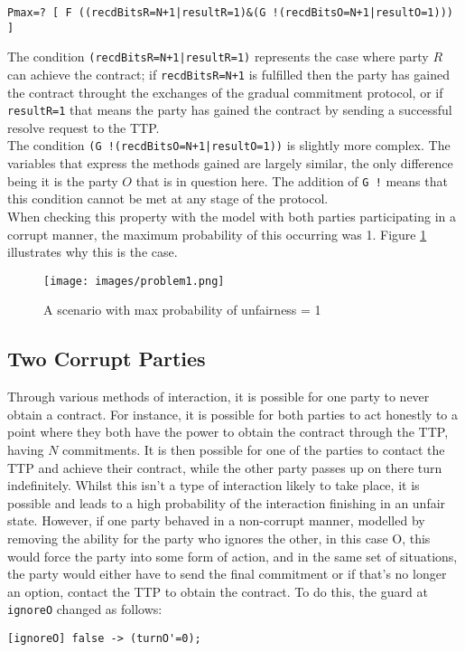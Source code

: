 \documentclass{l4proj}
\begin{document}
\begin{lstlisting}
Pmax=? [ F ((recdBitsR=N+1|resultR=1)&(G !(recdBitsO=N+1|resultO=1))) ]
\end{lstlisting}

The condition {\tt (recdBitsR=N+1|resultR=1)} represents the case where party $R$ can achieve the contract; if {\tt recdBitsR=N+1} is fulfilled then the party has gained the contract throught the exchanges of the gradual commitment protocol, or if {\tt resultR=1} that means the party has gained the contract by sending a successful resolve request to the TTP. \\
The condition {\tt (G !(recdBitsO=N+1|resultO=1))} is slightly more complex. The variables that express the methods gained are largely similar, the only difference being it is the party $O$ that is in question here. The addition of {\tt G !} means that this condition cannot be met at any stage of the protocol.\\
When checking this property with the model with both parties participating in a corrupt manner, the maximum probability of this occurring was 1. Figure \ref{problem1} illustrates why this is the case.

\begin{figure}[h!]
\centering
\texttt{[image: images/problem1.png]}
\caption{A scenario with max probability of unfairness = 1}
\label{problem1}
\end{figure}

\subsection{Two Corrupt Parties}

Through various methods of interaction, it is possible for one party to never obtain a contract. For instance, it is possible for both parties to act honestly to a point where they both have the power to obtain the contract through the TTP, having $N$ commitments. It is then possible for one of the parties to contact the TTP and achieve their contract, while the other party passes up on there turn indefinitely. Whilst this isn't a type of interaction likely to take place, it is possible and leads to a high probability of the interaction finishing in an unfair state. However, if one party behaved in a non-corrupt manner, modelled by removing the ability for the party who ignores the other, in this case O, this would force the party into some form of action, and in the same set of situations, the party would either have to send the final commitment or if that's no longer an option, contact the TTP to obtain the contract. To do this, the guard at {\tt ignoreO} changed as follows:
\begin{verbatim}
[ignoreO] false -> (turnO'=0);
\end{verbatim}
\end{document}
